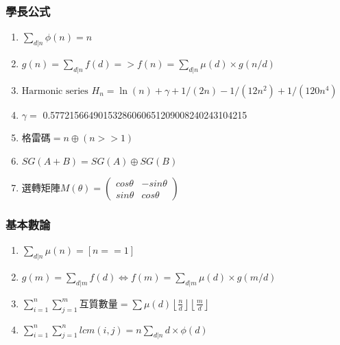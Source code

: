 \subsubsection{學長公式}
\begin{enumerate}\itemsep = -3pt
\item $\sum_{d|n} \phi(n) = n$
\item $g(n) = \sum_{d|n} f(d) => f(n) = \sum_{d|n} \mu(d) \times g(n/d)$
\item $\text{Harmonic series } H_n = \ln(n) + \gamma + 1/(2n) - 1/(12n^2) + 1/(120n^4)$
\item $ \gamma =$ 0.57721566490153286060651209008240243104215
\item 格雷碼$=n\oplus (n>>1)$
\item $SG(A+B)=SG(A)\oplus SG(B)$
\item 選轉矩陣$M(\theta)= \left( \begin{array}{ccc}
cos\theta & -sin\theta \\ 
sin\theta &  cos\theta
\end{array} \right)$
\end{enumerate}

\subsubsection{基本數論}
\begin{enumerate}\itemsep = -3pt
	\item $\sum_{d|n} \mu (n)=[n==1]$
	\item $g(m)=\sum_{d|m}f(d)\Leftrightarrow f(m)=\sum_{d|m}\mu (d) \times g(m/d)$
	\item $\sum_{i=1}^n\sum_{j=1}^m$互質數量$=\sum \mu (d)\left \lfloor \frac{n}{d} \right \rfloor \left \lfloor \frac{m}{d} \right \rfloor$
	\item $\sum_{i=1}^n\sum_{j=1}^nlcm(i,j)=n\sum_{d|n} d \times \phi (d)$
\end{enumerate}

